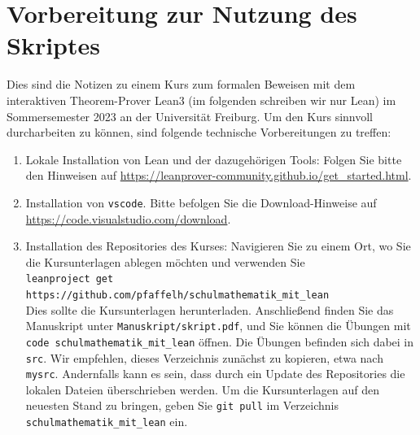 \documentclass[11pt]{article}
\newcommand{\leanstate}{\texttt}
\begin{document}
\section{Vorbereitung zur Nutzung des Skriptes}
\label{S:vorbereitung}
Dies sind die Notizen zu einem Kurs zum formalen Beweisen mit dem interaktiven Theorem-Prover Lean3 (im folgenden schreiben wir nur Lean) im Sommersemester 2023 an der Universität Freiburg. Um den Kurs sinnvoll durcharbeiten zu können, sind folgende technische Vorbereitungen zu treffen:
\begin{enumerate}
\item Lokale Installation von Lean und der dazugehörigen Tools: Folgen Sie bitte den Hinweisen auf \url{https://leanprover-community.github.io/get_started.html}.
\item Installation von {\tt vscode}. Bitte befolgen Sie die Download-Hinweise auf \url{https://code.visualstudio.com/download}.
\item Installation des Repositories des Kurses: Navigieren Sie zu einem Ort, wo Sie die Kursunterlagen ablegen möchten und verwenden Sie \\
  \leanstate{leanproject get https://github.com/pfaffelh/schulmathematik_mit_lean}
  \\
  \sloppy Dies sollte die Kursunterlagen herunterladen. Anschließend finden Sie das Manuskript unter {\tt Manuskript/skript.pdf}, und Sie können die Übungen mit \leanstate{code schulmathematik_mit_lean} öffnen. Die Übungen befinden sich dabei in {\tt src}. Wir empfehlen, dieses Verzeichnis zunächst zu kopieren, etwa nach {\tt mysrc}. Andernfalls kann es sein, dass durch ein Update des Repositories die lokalen Dateien überschrieben werden. Um die Kursunterlagen auf den neuesten Stand zu bringen, geben Sie {\tt git pull} im Verzeichnis \leanstate{schulmathematik_mit_lean} ein.
\end{enumerate}
\end{document}
